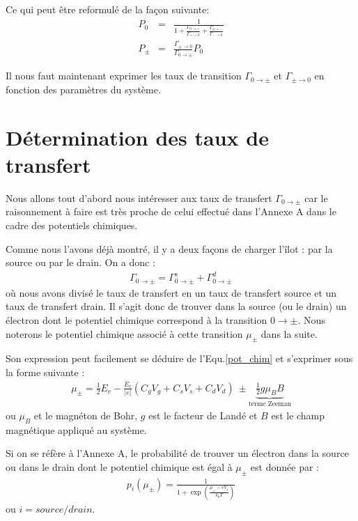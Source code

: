 Ce qui peut être reformulé de la façon suivante:
\begin{eqnarray}
P_0 &=& \frac{1}{1 + \frac{\Gamma_{0 \rightarrow +}}{\Gamma_{+ \rightarrow 0}} + \frac{\Gamma_{0 \rightarrow -}}{\Gamma_{- \rightarrow 0}}} \\
P_{\pm} &=& \frac{\Gamma_{\pm \rightarrow 0}}{\Gamma_{0 \rightarrow \pm}}P_0 
\end{eqnarray}


Il nous faut maintenant exprimer les taux de transition $\Gamma_{0 \rightarrow \pm}$ et $\Gamma_{\pm \rightarrow 0}$ en fonction des paramètres du système. 

\section{Détermination des taux de transfert}
Nous allons tout d'abord nous intéresser aux taux de transfert $\Gamma_{0 \rightarrow \pm}$ car le raisonnement à faire est très proche de celui effectué dans l'Annexe A dans le cadre des potentiels chimiques. 

Comme nous l'avons déjà montré, il y a deux façons de charger l'\^ilot : par la source ou par le drain. On a donc :
\begin{eqnarray}
\Gamma_{0 \rightarrow \pm} = \Gamma_{0 \rightarrow \pm}^s + \Gamma_{0 \rightarrow \pm}^d
\end{eqnarray}
où nous avons divisé le taux de transfert en un taux de transfert source et un taux de transfert drain. Il s'agit donc de trouver dans la source (ou le drain) un électron dont le potentiel chimique correspond à la transition $0\rightarrow \pm$. Nous noterons le potentiel chimique associé à cette transition $\mu_{\pm}$ dans la suite. 

Son expression peut facilement se déduire de l'Equ.\ref{pot_chim} et s'exprimer sous la forme suivante :
\begin{eqnarray}
\mu_{\pm} = \frac{1}{2}E_c - \frac{E_c}{|e|}(C_gV_g + C_sV_s + C_dV_d)~ \pm \underbrace{ \frac{1}{2}g \mu_B B}_{\text{terme Zeeman}}
\end{eqnarray}
ou  $\mu_B$ et le magnéton de Bohr, $g$ est le facteur de Landé et $B$ est le champ magnétique appliqué au système.

Si on se réfère à l'Annexe A, le probabilité de trouver un électron dans la source ou dans le drain dont le potentiel chimique est égal à $\mu_{\pm}$ est donnée par :
\begin{eqnarray}
p_i(\mu_\pm) = \frac{1}{1 + \exp{(\frac{\mu_\pm - eV_i}{k_bT})}}
\end{eqnarray}
ou $i=source/drain$. 

